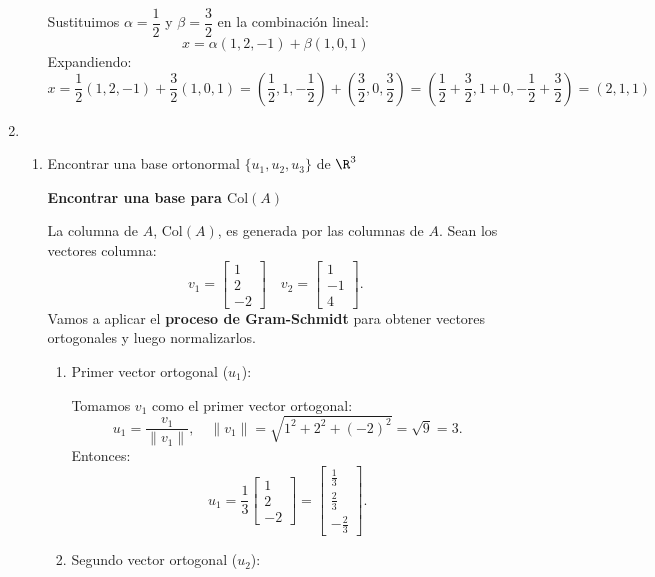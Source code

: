 \begin{enumerate}[label=\color{red}\textbf{\arabic*)}]
\begin{enumerate}[label=Paso \arabic*:]
            Sustituimos $\alpha=\dfrac{1}{2}$ y $\beta=\dfrac{3}{2}$ en la combinación lineal: \[
            x=\alpha(1,2,-1)+\beta(1,0,1)
            \] 
            Expandiendo: \[
            x=\dfrac{1}{2}(1,2,-1)+\dfrac{3}{2}(1,0,1)=\left( \dfrac{1}{2},1,-\dfrac{1}{2} \right) +\left( \dfrac{3}{2},0,\dfrac{3}{2} \right) =\left( \dfrac{1}{2}+\dfrac{3}{2},1+0,-\dfrac{1}{2}+\dfrac{3}{2} \right) =(2,1,1)
            \] 
    \end{enumerate}
\item {} 

\begin{enumerate}[label=Paso \arabic*:]
    \item Encontrar una base ortonormal $\{u_1,u_2,u_3\}$ de $\R^3$

\textbf{Encontrar una base para $\mathrm{Col}(A)$}

La columna de $A$, $\mathrm{Col}(A)$, es generada por las columnas de $A$. Sean los vectores columna: \[
v_1=\begin{bmatrix}1\\2\\-2\end{bmatrix}\quad v_2=\begin{bmatrix}1\\-1\\4\end{bmatrix}.
\]
Vamos a aplicar el \textbf{proceso de Gram-Schmidt} para obtener vectores ortogonales y luego normalizarlos.

\begin{enumerate}[label=1.\arabic*)]
    \item Primer vector ortogonal ($u_1$):

Tomamos $v_1$ como el primer vector ortogonal: \[u_1=\dfrac{v_1}{\|v_1\|},\quad \|v_1\|=\sqrt{1^2+2^2+(-2)^2}=\sqrt{9}=3.\]
Entonces: \[u_1=\dfrac{1}{3}\begin{bmatrix}1\\2\\-2\end{bmatrix}=\begin{bmatrix}\frac{1}{3}\\\frac{2}{3}\\-\frac{2}{3}\end{bmatrix}.\]
\item Segundo vector ortogonal ($u_2$):


\end{enumerate}
\end{enumerate}
\end{enumerate}
